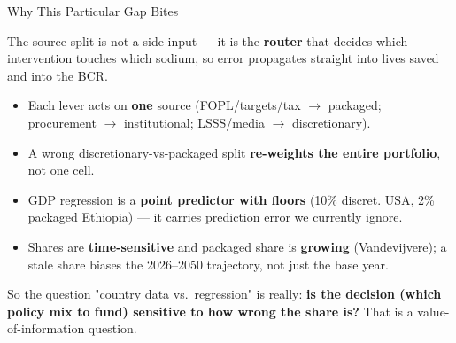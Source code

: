 \documentclass[
  11pt,
  ignorenonframetext,
  aspectratio=169]{beamer}
\begin{document}
\begin{frame}{Why This Particular Gap Bites}
\label{why-this-particular-gap-bites}
\justifying
\footnotesize

The source split is not a side input --- it is the \textbf{router} that
decides which intervention touches which sodium, so error propagates
straight into lives saved and into the BCR.

\medskip
\begin{itemize}
  \item Each lever acts on \textbf{one} source (FOPL/targets/tax $\to$ packaged; procurement $\to$ institutional; LSSS/media $\to$ discretionary).
  \item A wrong discretionary-vs-packaged split \textbf{re-weights the entire portfolio}, not one cell.
  \item GDP regression is a \textbf{point predictor with floors} (10\% discret. USA, 2\% packaged Ethiopia) --- it carries prediction error we currently ignore.
  \item Shares are \textbf{time-sensitive} and packaged share is \textbf{growing} (Vandevijvere); a stale share biases the 2026--2050 trajectory, not just the base year.
\end{itemize}

\medskip
\begin{block}{}
\footnotesize
So the question "country data vs.\ regression" is really: \textbf{is the decision (which policy mix to fund) sensitive to how wrong the share is?} That is a value-of-information question.
\end{block}
\end{frame}
\end{document}
